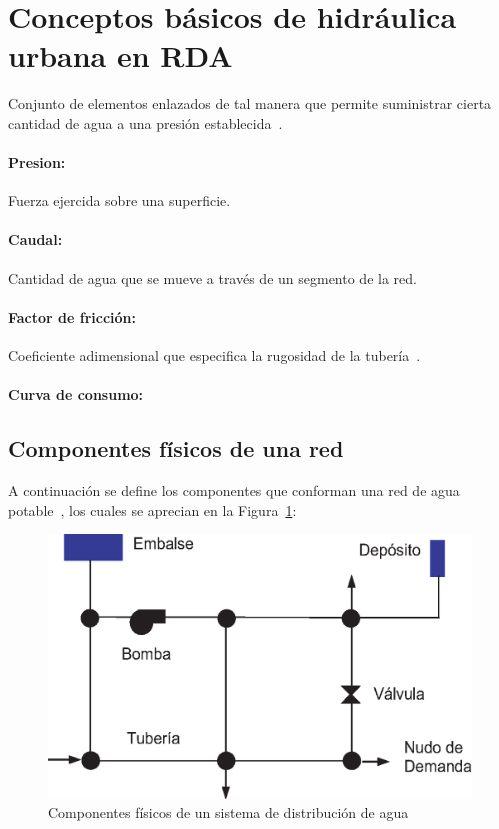 \section{Conceptos básicos de hidráulica urbana en RDA}
Conjunto de elementos enlazados de tal manera que permite suministrar cierta cantidad de agua a una presión establecida~\cite{Doctoral2012}.

\paragraph{Presion:} Fuerza ejercida sobre una superficie.
\paragraph{Caudal:} Cantidad de agua que se mueve a través de un segmento de la red.
\paragraph{Factor de fricción:} Coeficiente adimensional que especifica la rugosidad de la tubería~\cite{Perez-2011}.
\paragraph{Curva de consumo:}

\subsection{Componentes físicos de una red}
A continuación se define los componentes que conforman una red de agua potable~\cite{Rossman2017}, los cuales se aprecian en la Figura~\ref{fig:componentesfisicos}:


\begin{figure}[h]
	 \includegraphics{Capitulo2/assets/componentesfisicosred.eps}
	\centering
	\caption[Componentes físicos de un sistema de distribución de agua]{Componentes físicos de un sistema de distribución de agua~\cite{Rossman2017}}
	\label{fig:componentesfisicos}
\end{figure}
